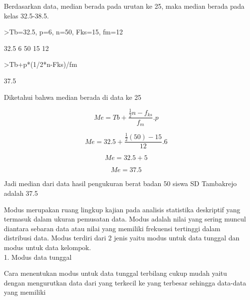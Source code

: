 \documentclass[a4paper,10pt]{article}
\begin{document}
\begin{eulernotebook}
\begin{eulercomment}
Berdasarkan data, median berada pada urutan ke 25, maka median berada
pada kelas 32.5-38.5.
\end{eulercomment}
\begin{eulerprompt}
>Tb=32.5, p=6, n=50, Fks=15, fm=12
\end{eulerprompt}
\begin{euleroutput}
  32.5
  6
  50
  15
  12
\end{euleroutput}
\begin{eulerprompt}
>Tb+p*(1/2*n-Fks)/fm
\end{eulerprompt}
\begin{euleroutput}
  37.5
\end{euleroutput}
\begin{eulercomment}
Diketahui bahwa median berada di data ke 25\\
\end{eulercomment}
\begin{eulerformula}
\[
Me = Tb+\frac{\frac {1}{2}{n}-f_{ks}}{f_m}.{p}
\]
\end{eulerformula}
\begin{eulerformula}
\[
Me = 32.5+\frac{\frac{1}{2}({50})-15}{12}.{6}
\]
\end{eulerformula}
\begin{eulerformula}
\[
Me = 32.5+5
\]
\end{eulerformula}
\begin{eulerformula}
\[
Me = 37.5
\]
\end{eulerformula}
\begin{eulercomment}
Jadi median dari data hasil pengukuran berat badan 50 siswa SD
Tambakrejo adalah 37.5
\end{eulercomment}
\begin{eulercomment}
Modus merupakan ruang lingkup kajian pada analisis statistika
deskriptif yang termasuk dalam ukuran pemusatan data. Modus adalah
nilai yang sering muncul diantara sebaran data atau nilai yang
memiliki frekuensi tertinggi dalam distribusi data. Modus terdiri dari
2 jenis yaitu modus untuk data tunggal dan modus untuk data kelompok.\\
1. Modus data tunggal\\
\end{eulercomment}
\begin{eulerttcomment}
   Cara menentukan modus untuk data tunggal
   terbilang cukup mudah yaitu dengan
   mengurutkan data dari yang terkecil ke yang
   terbesar sehingga data-data yang memiliki

\end{eulerttcomment}
\end{eulernotebook}
\end{document}
